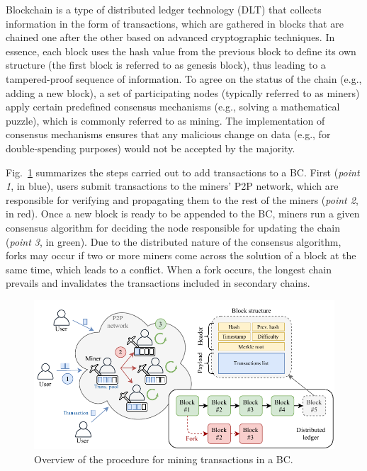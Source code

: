 \documentclass[10pt,journal,compsoc]{IEEEtran}
\begin{document}
Blockchain is a type of distributed ledger technology (DLT) that collects information in the form of transactions, which are gathered in blocks that are chained one after the other based on advanced cryptographic techniques. In essence, each block uses the hash value from the previous block to define its own structure (the first block is referred to as genesis block), thus leading to a tampered-proof sequence of information. To agree on the status of the chain (e.g., adding a new block), a set of participating nodes (typically referred to as miners) apply certain predefined consensus mechanisms (e.g., solving a mathematical puzzle), which is commonly referred to as mining. The implementation of consensus mechanisms ensures that any malicious change on data (e.g., for double-spending purposes) would not be accepted by the majority.

Fig.~\ref{fig:blockchain_summary} summarizes the steps carried out to add transactions to a BC. First (\textit{point 1}, in blue), users submit transactions to the miners' P2P network, which are responsible for verifying and propagating them to the rest of the miners (\textit{point 2}, in red). Once a new block is ready to be appended to the BC, miners run a given consensus algorithm for deciding the node responsible for updating the chain (\textit{point 3}, in green). Due to the distributed nature of the consensus algorithm, forks may occur if two or more miners come across the solution of a block at the same time, which leads to a conflict. When a fork occurs, the longest chain prevails and invalidates the transactions included in secondary chains.

\begin{figure}[ht!]
	\centering
	\includegraphics[width=\linewidth]{img/blockchain_summary.pdf}
	\caption{Overview of the procedure for mining transactions in a BC.}
	\label{fig:blockchain_summary}
\end{figure}
\end{document}
